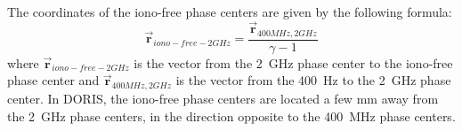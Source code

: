 The coordinates of the iono-free phase centers are given by the following formula:
\begin{equation}
  \vec{\bm{r}}_{iono-free-2GHz} = \frac{\vec{\bm{r}}_{400MHz,2GHz}}{\gamma - 1}
\end{equation}
where \(\vec{\bm{r}}_{iono-free-2GHz}\) is the vector from the \SI{2}{\GHz} 
phase center to the iono-free phase center and \(\vec{\bm{r}}_{400MHz,2GHz}\) 
is the vector from the \SI{400}{\Hz} to the \SI{2}{\GHz} phase center. In 
DORIS, the iono-free phase centers are located a few mm away from the 
\SI{2}{\GHz} phase centers, in the direction opposite to the \SI{400}{\MHz} 
phase centers.
\fi
